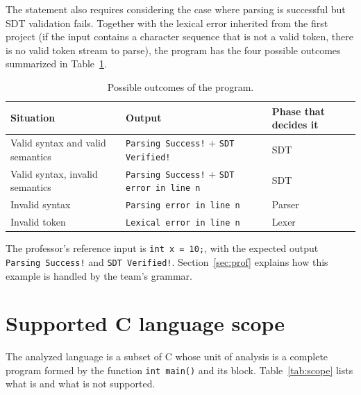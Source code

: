 \documentclass[11pt,letterpaper]{article}
\let\oldsection\section
\renewcommand{\section}{\needspace{8\baselineskip}\oldsection}
\newcommand{\ok}[1]{\textcolor{okgreen}{\texttt{#1}}}
\newcommand{\bad}[1]{\textcolor{errred}{\texttt{#1}}}
\begin{document}
The statement also requires considering the case where parsing is successful
but SDT validation fails. Together with the lexical error inherited from the
first project (if the input contains a character sequence that is not a valid
token, there is no valid token stream to parse), the program has the four
possible outcomes summarized in Table~\ref{tab:outcomes}.

\begin{table}[!htbp]
\centering
\caption{Possible outcomes of the program.}
\label{tab:outcomes}
\small
\begin{tabular}{@{}lll@{}}
\toprule
\textbf{Situation} & \textbf{Output} & \textbf{Phase that decides it} \\
\midrule
Valid syntax and valid semantics & \ok{Parsing Success!} + \ok{SDT Verified!} & SDT \\
Valid syntax, invalid semantics  & \ok{Parsing Success!} + \bad{SDT error in line n} & SDT \\
Invalid syntax                    & \bad{Parsing error in line n} & Parser \\
Invalid token                     & \bad{Lexical error in line n} & Lexer \\
\bottomrule
\end{tabular}
\end{table}

The professor's reference input is \texttt{int x = 10;}, with the expected
output \ok{Parsing Success!} and \ok{SDT Verified!}. Section~\ref{sec:prof}
explains how this example is handled by the team's grammar.

\section{Supported C language scope}

The analyzed language is a subset of C whose unit of analysis is a complete
program formed by the function \texttt{int main()} and its block. Table~\ref{tab:scope}
lists what is and what is not supported.
\end{document}
